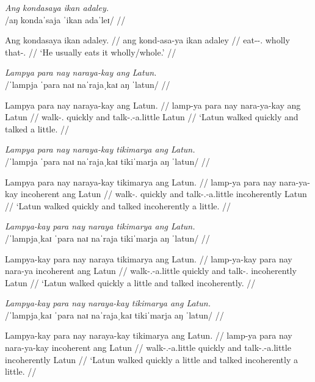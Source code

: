 \documentclass[12pt,a4paper]{scrartcl}
\newcommand{\PargI}{{\Parg}.{\Inan}}
\newcommand{\TsgM}{{\Tsg}.{\M}}
\begin{document}
\ex\begingl
\glpreamble \textit{Ang kondasaya ikan adaley.}\footnotemark \\
	/aŋ kondaˈsaja ˈikan adaˈleɪ/ //

\gla Ang kondasaya ikan adaley. //
\glb ang kond-asa-ya ikan adaley //
\glc \AgtT{} eat-\Hab{}-\TsgM{} wholly that-\PargI{} //
\glft `He usually eats it wholly/whole.' //
\endgl\xe


\ex\begingl
\glpreamble \textit{Lampya para nay naraya-kay ang Latun.} \\
	/ˈlampja ˈpara naɪ naˈrajaˌkaɪ aŋ ˈlatun/ //

\gla Lampya para nay naraya-kay ang Latun. //
\glb lamp-ya para nay nara-ya-kay ang Latun //
\glc walk-\TsgM{} quickly and talk-\TsgM{}-a.little \Aarg{} Latun //
\glft `Latun walked quickly and talked a little. //
\endgl\xe

\ex\begingl
\glpreamble \textit{Lampya para nay naraya-kay tikimarya ang Latun.} \\
	/ˈlampja ˈpara naɪ naˈrajaˌkaɪ tikiˈmarja aŋ ˈlatun/ //

\gla Lampya para nay naraya-kay tikimarya ang Latun. //
\glb lamp-ya para nay nara-ya-kay incoherent ang Latun //
\glc walk-\TsgM{} quickly and talk-\TsgM{}-a.little incoherently \Aarg{} Latun //
\glft `Latun walked quickly and talked incoherently a little. //
\endgl\xe

\ex\begingl
\glpreamble \textit{Lampya-kay para nay naraya tikimarya ang Latun.} \\
	/ˈlampjaˌkaɪ ˈpara naɪ naˈraja tikiˈmarja aŋ ˈlatun/ //

\gla Lampya-kay para nay naraya tikimarya ang Latun. //
\glb lamp-ya-kay para nay nara-ya incoherent ang Latun //
\glc walk-\TsgM{}-a.little quickly and talk-\TsgM{} incoherently \Aarg{} Latun //
\glft `Latun walked quickly a little and talked incoherently. //
\endgl\xe

\ex\begingl
\glpreamble \textit{Lampya-kay para nay naraya-kay tikimarya ang Latun.} \\
	/ˈlampjaˌkaɪ ˈpara naɪ naˈrajaˌkaɪ tikiˈmarja aŋ ˈlatun/ //

\gla Lampya-kay para nay naraya-kay tikimarya ang Latun. //
\glb lamp-ya para nay nara-ya-kay incoherent ang Latun //
\glc walk-\TsgM{}-a.little quickly and talk-\TsgM{}-a.little incoherently \Aarg{} Latun //
\glft `Latun walked quickly a little and talked incoherently a little. //
\endgl\xe
\end{document}
